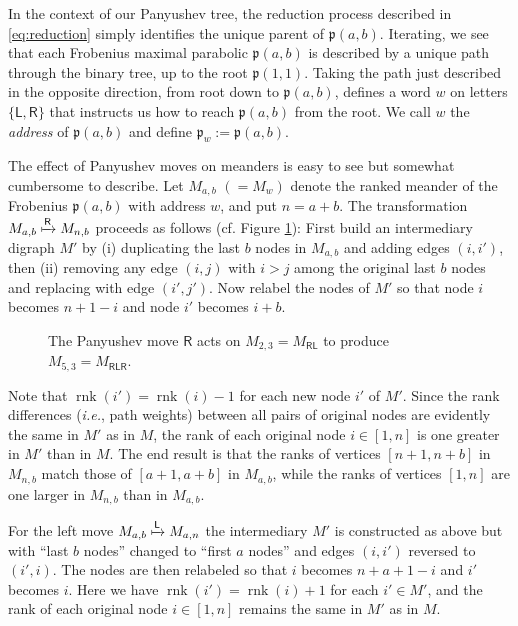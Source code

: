\documentclass{amsart}
\def\fp{\mathfrak p} %
\newcommand{\pab}[1][a,b]{\fp(#1)}
\def\rnk{\operatorname{rnk}}
\def\pL{\mathsf L}
\def\pR{\mathsf R}
\theoremstyle{definition}
\begin{document}
In the context of our Panyushev tree, the reduction process described in \eqref{eq:reduction} simply identifies the unique parent of $\pab$. Iterating, we see that each Frobenius maximal parabolic $\pab$ is described by a unique path through the binary tree, up to the root $\pab[1,1]$. 
Taking the path just described in the opposite direction, from root down to $\pab$, defines a word $w$ on letters $\{\pL,\pR\}$ that instructs us how to reach $\pab$ from the root. We call $w$ the \emph{address} of $\pab$ and  define $\fp_w := \pab$.


The effect of Panyushev moves on meanders is easy to see but somewhat cumbersome to describe. Let $M_{a,b}$ $(= M_w)$ denote the ranked meander of the  Frobenius  $\pab$ with address $w$, and put $n=a+b$. The transformation $M_{a,b} \xmapsto{\pR} M_{n,b}$ proceeds as follows (cf.  Figure \ref{fig:panyushev-move-on-meanders}): First build an intermediary digraph $M'$ by 
 (i) duplicating the last $b$ nodes in $M_{a,b}$ and adding edges $(i,i')$, then  
 (ii) removing any edge $(i,j)$ with $i>j$ among the original last $b$ nodes and replacing with edge $(i',j')$. 
 Now relabel the  nodes of $M'$ so that node $i$ becomes $n+1-i$ and  node $i'$ becomes $i+b$. 
\begin{figure}[!hbt]
\centering

\caption{The Panyushev move $\pR$ acts on  $M_{2,3}=M_{\pR\pL}$ to produce $M_{5,3}=M_{\pR\pL\pR}$.}
\label{fig:panyushev-move-on-meanders}
\end{figure}

Note that $\rnk(i')=\rnk(i)-1$ for each new node $i'$ of $M'$. Since  the  rank differences ({\it i.e.}, path weights) between all pairs of original nodes are evidently the same in $M'$ as in $M$, the rank of each original node $i \in [1,n]$ is  one greater in $M'$ than in $M$. The end result is that the ranks of vertices $[n+1,n+b]$ in $M_{n,b}$ match those of  $[a+1,a+b]$ in $M_{a,b}$, while the ranks of vertices $[1,n]$ are one larger in $M_{n,b}$ than in $M_{a,b}$. 

For the  left move $M_{a,b} \xmapsto{\pL} M_{a,n}$ the intermediary $M'$ is constructed as above but with ``last $b$ nodes''  changed to  ``first $a$ nodes'' and  edges $(i,i')$ reversed to $(i',i)$.   The nodes  are then relabeled so that $i$ becomes $n+a+1-i$ and $i'$ becomes $i$.  Here we have $\rnk(i')=\rnk(i)+1$ for each $i' \in M'$,
and the rank of each original node $i \in [1,n]$ remains the same in $M'$ as in $M$.
\end{document}
